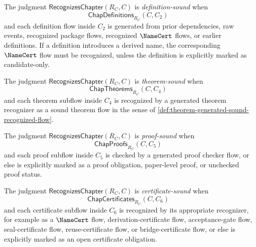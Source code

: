 \begin{definition}
\label{def:chapter-generated-definition-sound}
The judgment $\mathsf{RecognizesChapter}(R_C,C)$ is \emph{definition-sound} when
$$
  \mathsf{ChapDefinitions}_{R_C}(C,C_2)
$$
and each definition flow inside $C_2$ is generated from prior dependencies, raw events, recognized package flows, recognized $\NameCert$ flows, or earlier definitions. If a definition introduces a derived name, the corresponding $\NameCert$ flow must be recognized, unless the definition is explicitly marked as candidate-only.
\end{definition}

\begin{definition}
\label{def:chapter-generated-theorem-sound}
The judgment $\mathsf{RecognizesChapter}(R_C,C)$ is \emph{theorem-sound} when
$$
  \mathsf{ChapTheorems}_{R_C}(C,C_4)
$$
and each theorem subflow inside $C_4$ is recognized by a generated theorem recognizer as a sound theorem flow in the sense of \autoref{def:theorem-generated-sound-recognized-flow}.
\end{definition}

\begin{definition}
\label{def:chapter-generated-proof-sound}
The judgment $\mathsf{RecognizesChapter}(R_C,C)$ is \emph{proof-sound} when
$$
  \mathsf{ChapProofs}_{R_C}(C,C_5)
$$
and each proof subflow inside $C_5$ is checked by a generated proof checker flow, or else is explicitly marked as a proof obligation, paper-level proof, or unchecked proof status.
\end{definition}

\begin{definition}
\label{def:chapter-generated-certificate-sound}
The judgment $\mathsf{RecognizesChapter}(R_C,C)$ is \emph{certificate-sound} when
$$
  \mathsf{ChapCertificates}_{R_C}(C,C_6)
$$
and each certificate subflow inside $C_6$ is recognized by its appropriate recognizer, for example as a $\NameCert$ flow, derivation-certificate flow, acceptance-gate flow, seal-certificate flow, reuse-certificate flow, or bridge-certificate flow, or else is explicitly marked as an open certificate obligation.
\end{definition}

